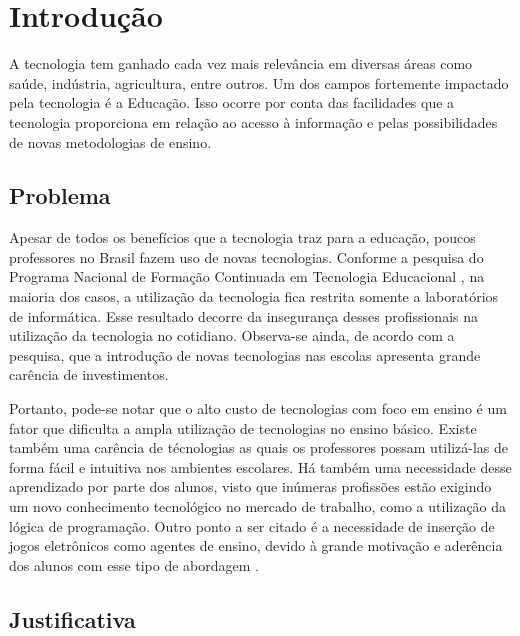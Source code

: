 
\chapter{Introdução}\label{intro}

A tecnologia tem ganhado cada vez mais relevância em diversas áreas como saúde, indústria, agricultura, entre outros. Um dos campos fortemente impactado pela tecnologia é a Educação. Isso ocorre por conta das facilidades que a tecnologia proporciona em relação ao acesso à informação e pelas possibilidades de novas metodologias de ensino. 


\section{Problema}

Apesar de todos os benefícios que a tecnologia traz para a educação, poucos professores no Brasil fazem uso de novas tecnologias. Conforme a pesquisa do Programa Nacional de Formação Continuada em Tecnologia Educacional \cite{suenia_andre_2012}, na maioria dos casos, a utilização da tecnologia fica restrita somente a laboratórios de informática. Esse resultado decorre da insegurança desses profissionais na utilização da tecnologia no cotidiano. Observa-se ainda, de acordo com a pesquisa, que a introdução de novas tecnologias nas escolas apresenta grande carência de investimentos.

Portanto, pode-se notar que o alto custo de  tecnologias com foco em ensino é um fator que dificulta a ampla utilização de tecnologias no ensino básico. Existe também uma carência de técnologias as quais os professores possam utilizá-las de forma fácil e intuitiva nos ambientes escolares. Há também uma necessidade desse aprendizado por parte dos alunos, visto que inúmeras profissões estão exigindo um novo conhecimento tecnológico no mercado de trabalho, como a utilização da lógica de programação. Outro ponto a ser citado é a necessidade de inserção de jogos eletrônicos como agentes de ensino, devido à grande motivação e aderência dos alunos com esse tipo de abordagem \cite{kaue_tatiane_marcos_2017}.


\section{Justificativa}

